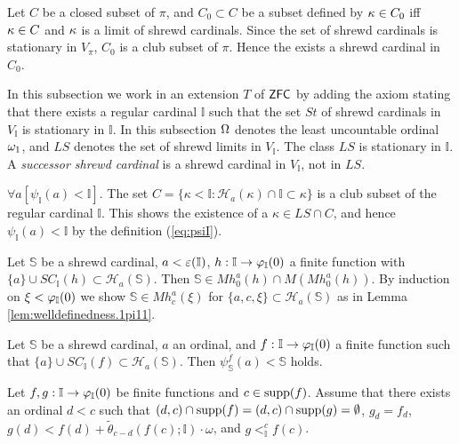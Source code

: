 \documentclass{article}
\newcommand{\mS}{\mathbb{S}}
\newcommand{\mI}{\mathbb{I}}
\begin{document}
 
Let $C$ be a closed subset of $\pi$, and
$C_{0}\subset C$ be a subset defined by
$\kappa\in C_{0}$ iff $\kappa\in C$ and $\kappa$ is a limit of shrewd cardinals.
Since the set of shrewd cardinals is stationary in $V_{\pi}$,
$C_{0}$ is a club subset of $\pi$.
Hence the exists a shrewd cardinal in $C_{0}$.


In this subsection we work in an extension $T$ of ${\sf ZFC}$ by adding
the axiom stating that
there exists a regular cardinal $\mI$ such that
the set $St$ of shrewd cardinals in $V_{\mI}$ is stationary in $\mI$.
In this subsection $\Omega$ denotes the least uncountable ordinal $\omega_{1}$, and
$LS$ denotes the set of 
shrewd limits in $V_{\mI}$.
The class $LS$ is stationary in $\mI$.
A \textit{successor shrewd cardinal} is a shrewd cardinal in $V_{\mI}$, not in $LS$.



\blem\label{lem:welldefinedness.2}
$\forall a[
\psi_{\mI}(a)<\mI]$.
\elem
\bprf
The set
$C=\{\kappa<\mI: 
\mathcal{H}_{a}(\kappa)\cap\mI\subset\kappa\}$
 is a club subset of the regular cardinal $\mI$.
This shows the existence of a $\kappa\in LS \cap C$, and hence
$\psi_{\mI}(a)<\mI$ by the definition (\ref{eq:psiI}).
\eprf






\blem\label{lem:welldefinedness.1}
Let $\mS$ be a shrewd cardinal, 
$a<\veps(\mI)$, $h:\mI\to\vphi_{\mI}(0)$ a finite function 
with
$\{a\}\cup SC_{\mI}(h)\subset\mathcal{H}_{a}(\mS)$. Then
$\mS\in Mh^{a}_{0}(h)\cap M(Mh^{a}_{0}(h))$.
\elem
\bprf
By induction on $\xi<\vphi_{\mI}(0)$ we show $\mS\in Mh^{a}_{c}(\xi)$
for $\{a,c,\xi\}\subset\mathcal{H}_{a}(\mS)$ as in Lemma \ref{lem:welldefinedness.1pi11}.
\eprf

\blem\label{lem:limitcollapse.1}
Let $\mS$ be 
a shrewd cardinal, $a$ an ordinal, and
$f:\mI\to\vphi_{\mI}(0)$ a finite function 
such that $\{a\}\cup SC_{\mI}(f)\subset\mathcal{H}_{a}(\mathbb{S})$.
Then
$\psi_{\mathbb{S}}^{f}(a)<\mathbb{S}$ holds.
\elem









\bcor\label{cor:stepdown}
Let $f,g:\mI\to\vphi_{\mI}(0)$
 be finite functions and $c\in{\rm supp}(f)$.
Assume  that 
there exists an ordinal
$d<c$ 
such that
$(d,c)\cap {\rm supp}(f)=(d,c)\cap {\rm supp}(g)=\emptyset$, 
$g_{d}=f_{d}$, 
$g(d)<f(d)+\tilde{\theta}_{c-d}(f(c);\mI)\cdot\omega$,
and
$g<_{\mI}^{c}f(c)$.
\end{document}
